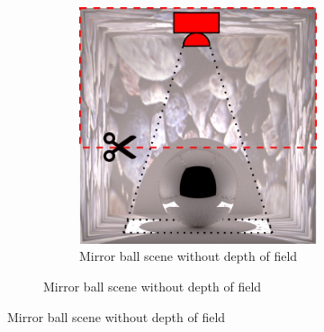 \begin{figure}[]
    \centering    
    \begin{subfigure}{\textwidth}
        \centering
        \begin{subfigure}{0.5\textwidth}
            \centering
            \includegraphics[width=\textwidth]{images/04-experiment03/ball/scene_highlighted.jpg}
            \caption*{Mirror ball scene without depth of field}
        \end{subfigure}


\end{subfigure}
\end{figure}
